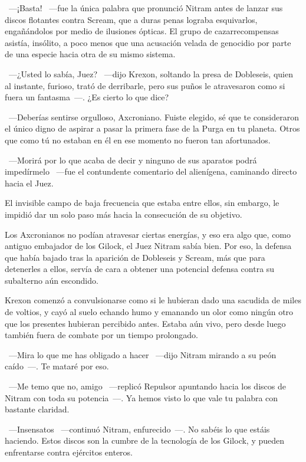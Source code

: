 ~---¡Basta! ~---fue la única palabra que pronunció Nitram antes de lanzar sus discos flotantes contra Scream, que a duras penas lograba esquivarlos, engañándolos por medio de ilusiones ópticas. El grupo de cazarrecompensas asistía, insólito, a poco menos que una acusación velada de genocidio por parte de una especie hacia otra de su mismo sistema.

~---¿Usted lo sabía, Juez? ~---dijo Krexon, soltando la presa de Dobleseis, quien al instante, furioso, trató de derribarle, pero sus puños le atravesaron como si fuera un fantasma~---. ¿Es cierto lo que dice?

~---Deberías sentirse orgulloso, Axcroniano. Fuiste elegido, sé que te consideraron el único digno de aspirar a pasar la primera fase de la Purga en tu planeta. Otros que como tú no estaban en él en ese momento no fueron tan afortunados.

~---Morirá por lo que acaba de decir y ninguno de sus aparatos podrá impedírmelo ~---fue el contundente comentario del alienígena, caminando directo hacia el Juez.

El invisible campo de baja frecuencia que estaba entre ellos, sin embargo, le impidió dar un solo paso más hacia la consecución de su objetivo.

Los Axcronianos no podían atravesar ciertas energías, y eso era algo que, como antiguo embajador de los Gilock, el Juez Nitram sabía bien. Por eso, la defensa que había bajado tras la aparición de Dobleseis y Scream, más que para detenerles a ellos, servía de cara a obtener una potencial defensa contra su subalterno aún escondido.

Krexon comenzó a convulsionarse como si le hubieran dado una sacudida de miles de voltios, y cayó al suelo echando humo y emanando un olor como ningún otro que los presentes hubieran percibido antes. Estaba aún vivo, pero desde luego también fuera de combate por un tiempo prolongado.

~---Mira lo que me has obligado a hacer ~---dijo Nitram mirando a su peón caído~---. Te mataré por eso.

~---Me temo que no, amigo ~---replicó Repulsor apuntando hacia los discos de Nitram con toda su potencia~---. Ya hemos visto lo que vale tu palabra con bastante claridad.

~---Insensatos ~---continuó Nitram, enfurecido~---. No sabéis lo que estáis haciendo. Estos discos son la cumbre de la tecnología de los Gilock, y pueden enfrentarse contra ejércitos enteros.

